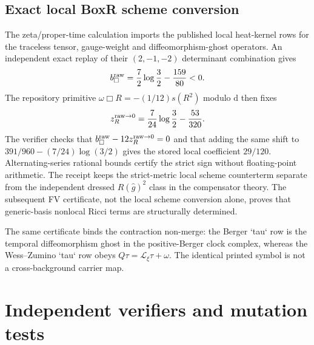 \documentclass[11pt]{article}
\theoremstyle{definition}
\theoremstyle{remark}
\newcommand{\dd}{\mathrm d}
\begin{document}
\subsection{Exact local BoxR scheme conversion}

The zeta/proper-time calculation imports the published local heat-kernel rows
for the traceless tensor, gauge-weight and diffeomorphism-ghost operators.  An
independent exact replay of their $(2,-1,-2)$ determinant combination gives
\[
 b_{\Box}^{\rm raw}=\frac72\log\frac32-\frac{159}{80}<0.
\]
The repository primitive $\omega\Box R=-(1/12)s(R^2)$ modulo $\dd$ then fixes
\[
 z_R^{\rm raw\to0}=\frac7{24}\log\frac32-\frac{53}{320}.
\]
The verifier checks that $b_{\Box}^{\rm raw}-12z_R^{\rm raw\to0}=0$ and that
adding the same shift to $391/960-(7/24)\log(3/2)$ gives the stored local
coefficient $29/120$.  Alternating-series rational bounds certify the strict
sign without floating-point arithmetic.  The receipt keeps the strict-metric
local scheme counterterm separate from the independent dressed
$R(\widehat g)^2$ class in the compensator theory.  The subsequent FV
certificate, not the local scheme conversion alone, proves that generic-basis
nonlocal Ricci terms are structurally determined.

The same certificate binds the contraction non-merge: the Berger `tau` row
is the temporal diffeomorphism ghost in the positive-Berger clock complex,
whereas the Wess--Zumino `tau` row obeys $Q\tau=\mathcal L_\xi\tau+\omega$.
The identical printed symbol is not a cross-background carrier map.

\section{Independent verifiers and mutation tests}
\end{document}
